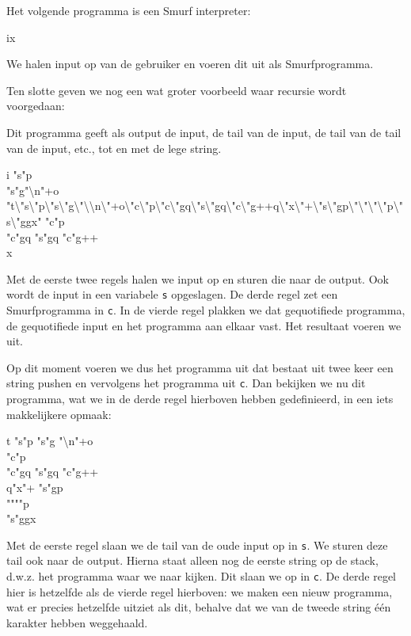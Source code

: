 \begin{exmp}
	Het volgende programma is een Smurf interpreter:
	\begin{smurf}
		ix
	\end{smurf}
	We halen input op van de gebruiker en voeren dit uit als Smurfprogramma.
\end{exmp}

Ten slotte geven we nog een wat groter voorbeeld waar recursie wordt
voorgedaan:

\begin{exmp}
	Dit programma geeft als output de input, de tail van de input, de tail van de
	tail van de input, etc., tot en met de lege string.
	\begin{smurf}
		\footnotesize
		i "s"p \\
		"s"g"\textbackslash{}n"+o \\
		"t\textbackslash{}"s\textbackslash{}"p\textbackslash{}"s\textbackslash{}"g\textbackslash{}"\textbackslash{}\textbackslash{}n\textbackslash{}"+o\textbackslash{}"c\textbackslash{}"p\textbackslash{}"c\textbackslash{}"gq\textbackslash{}"s\textbackslash{}"gq\textbackslash{}"c\textbackslash{}"g++q\textbackslash{}"x\textbackslash{}"+\textbackslash{}"s\textbackslash{}"gp\textbackslash{}"\textbackslash{}"\textbackslash{}"\textbackslash{}"p\textbackslash{}"s\textbackslash{}"ggx" "c"p \\
		"c"gq "s"gq "c"g++ \\
		x
	\end{smurf}
	Met de eerste twee regels halen we input op en sturen die naar de output. Ook
	wordt de input in een variabele \verb$s$ opgeslagen.
	De derde regel zet een Smurfprogramma in \verb$c$.
	In de vierde regel plakken we dat gequotifiede programma, de gequotifiede
	input en het programma aan elkaar vast. Het resultaat voeren we uit.

	Op dit moment voeren we dus het programma uit dat bestaat uit twee keer een
	string pushen en vervolgens het programma uit \verb$c$. Dan bekijken we nu
	dit programma, wat we in de derde regel hierboven hebben gedefinieerd, in een
	iets makkelijkere opmaak:
	\begin{smurf}
		t "s"p "s"g "\textbackslash{}n"+o \\
		"c"p \\
		"c"gq "s"gq "c"g++ \\
		q"x"+ "s"gp \\
		""""p \\
		"s"ggx
	\end{smurf}
	Met de eerste regel slaan we de tail van de oude input op in \verb$s$. We
	sturen deze tail ook naar de output. Hierna staat alleen nog de eerste string
	op de stack, d.w.z. het programma waar we naar kijken. Dit slaan we op in
	\verb$c$.
	De derde regel hier is hetzelfde als de vierde regel hierboven: we maken een
	nieuw programma, wat er precies hetzelfde uitziet als dit, behalve dat we van
	de tweede string één karakter hebben weggehaald.


\end{exmp}
